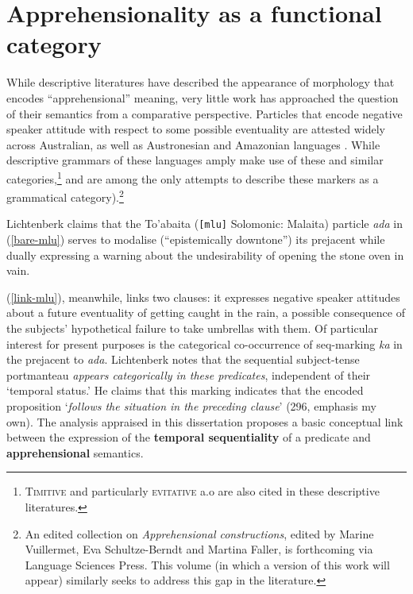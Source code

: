 \documentclass[11pt]{article}
\begin{document}
\section{Apprehensionality as a functional category}\label{typS}
While descriptive literatures have described the appearance of morphology that encodes ``apprehensional'' meaning, very little work has approached the question of their semantics from a comparative perspective. Particles that encode negative speaker attitude with respect to some possible eventuality are attested widely across Australian, as well as Austronesian and Amazonian languages \citep[258]{Angelo2016}. While descriptive grammars of these languages amply make use of these and similar categories,\footnote{\textsc{Timitive} and particularly \textsc{evitative} a.o are also cited in these descriptive literatures.} \citet{Lichtenberk1995} and \citet{Angelo2016} are among the only attempts to describe these markers as a grammatical category).\footnote{An edited collection on  \textit{Apprehensional constructions}, edited by Marine Vuillermet, Eva Schultze-Berndt and Martina Faller, is forthcoming via Language Sciences Press. This volume (in which a version of this work will appear) similarly seeks to address this gap in the literature.}


Lichtenberk claims that the To'abaita ({\tt[mlu]} Solomonic: Malaita) particle \textit{ada} in (\ref{bare-mlu}) serves to modalise (``epistemically downtone'') its prejacent while dually expressing a warning about the undesirability of opening the stone oven in vain.

(\ref{link-mlu}), meanwhile, links two clauses: it expresses negative speaker attitudes about a future eventuality of getting caught in the rain, a possible consequence of the subjects' hypothetical failure to take umbrellas with them. Of particular interest for present purposes is the categorical co-occurrence of {\sc seq}-marking \textit{ka} in the prejacent to \textit{ada}. Lichtenberk notes that the sequential subject-tense portmanteau \textit{appears categorically in these predicates}, independent of their `temporal status.' He claims that this marking indicates that the encoded proposition `\textit{follows the situation in the preceding clause}' (296, emphasis my own). The analysis appraised in this dissertation proposes a basic conceptual link between the expression of the \textbf{temporal sequentiality} of a predicate and \textbf{apprehensional} semantics.
\end{document}

